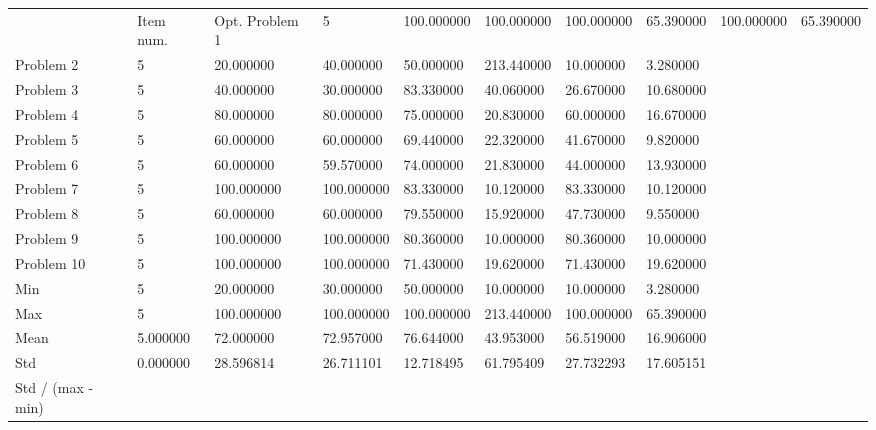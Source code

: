 \begin{tabular}{llllllll}
\toprule
 & Item num. & Opt. %
\midrule
Problem 1 & 5 & 100.000000 & 100.000000 & 100.000000 & 65.390000 & 100.000000 & 65.390000 \\
Problem 2 & 5 & 20.000000 & 40.000000 & 50.000000 & 213.440000 & 10.000000 & 3.280000 \\
Problem 3 & 5 & 40.000000 & 30.000000 & 83.330000 & 40.060000 & 26.670000 & 10.680000 \\
Problem 4 & 5 & 80.000000 & 80.000000 & 75.000000 & 20.830000 & 60.000000 & 16.670000 \\
Problem 5 & 5 & 60.000000 & 60.000000 & 69.440000 & 22.320000 & 41.670000 & 9.820000 \\
Problem 6 & 5 & 60.000000 & 59.570000 & 74.000000 & 21.830000 & 44.000000 & 13.930000 \\
Problem 7 & 5 & 100.000000 & 100.000000 & 83.330000 & 10.120000 & 83.330000 & 10.120000 \\
Problem 8 & 5 & 60.000000 & 60.000000 & 79.550000 & 15.920000 & 47.730000 & 9.550000 \\
Problem 9 & 5 & 100.000000 & 100.000000 & 80.360000 & 10.000000 & 80.360000 & 10.000000 \\
Problem 10 & 5 & 100.000000 & 100.000000 & 71.430000 & 19.620000 & 71.430000 & 19.620000 \\
Min & 5 & 20.000000 & 30.000000 & 50.000000 & 10.000000 & 10.000000 & 3.280000 \\
Max & 5 & 100.000000 & 100.000000 & 100.000000 & 213.440000 & 100.000000 & 65.390000 \\
Mean & 5.000000 & 72.000000 & 72.957000 & 76.644000 & 43.953000 & 56.519000 & 16.906000 \\
Std & 0.000000 & 28.596814 & 26.711101 & 12.718495 & 61.795409 & 27.732293 & 17.605151 \\
Std / (max - min) %
\bottomrule
\end{tabular}
